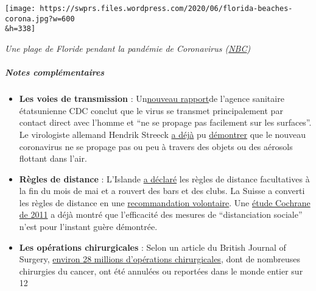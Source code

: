 \texttt{[image: https://swprs.files.wordpress.com/2020/06/florida-beaches-corona.jpg?w=600\\\&h=338]}

\emph{Une plage de Floride pendant la pandémie de Coronavirus
(\href{https://www.nbcnews.com/news/us-news/coronavirus-comes-spring-break-locals-close-florida-beaches-after-governor-n1163741}{NBC})}

\hypertarget{notes-compluxe9mentaires}{%
\subparagraph{\texorpdfstring{\textbf{Notes
complémentaires}}{Notes complémentaires}}\label{notes-compluxe9mentaires}}

\begin{itemize}
\tightlist
\item
  \textbf{Les voies de transmission} :
  Un\href{https://www.yahoo.com/lifestyle/cdc-coronavirus-mainly-spreads-through-persontoperson-contact-and-does-not-spread-easily-on-contaminated-surfaces-153317029.html}{nouveau
  rapport}de l'agence sanitaire étatsunienne CDC conclut que le virus se
  transmet principalement par contact direct avec l'homme et ``ne se
  propage pas facilement sur les surfaces''. Le virologiste allemand
  Hendrik Streeck
  \href{https://www.telegraph.co.uk/news/2020/04/02/no-proof-coronavirus-can-spread-shopping-says-leading-german/}{a
  déjà} pu
  \href{https://www.telegraph.co.uk/news/2020/04/02/no-proof-coronavirus-can-spread-shopping-says-leading-german/}{démontrer}
  que le nouveau coronavirus ne se propage pas ou peu à travers des
  objets ou des aérosols flottant dans l'air.
\item
  \textbf{Règles de distance} : L'Islande
  \href{https://www.telegraph.co.uk/news/2020/04/02/no-proof-coronavirus-can-spread-shopping-says-leading-german/}{a
  déclaré} les règles de distance facultatives à la fin du mois de mai
  et a rouvert des bars et des clubs. La Suisse a converti les règles de
  distance en une
  \href{https://www.20min.ch/story/bund-schafft-die-2-meter-abstands-busse-heimlich-ab-763738047957}{recommandation
  volontaire}. Une
  \href{https://www.cochranelibrary.com/cdsr/doi/10.1002/14651858.CD006207.pub4/full}{étude
  Cochrane de 2011} a déjà montré que l'efficacité des mesures de
  ``distanciation sociale'' n'est pour l'instant guère démontrée.
\item
  \textbf{Les opérations chirurgicales} : Selon un article du British
  Journal of Surgery,
  \href{https://bjssjournals.onlinelibrary.wiley.com/doi/abs/10.1002/bjs.11746}{environ
  28 millions d'opérations chirurgicales}, dont de nombreuses chirurgies
  du cancer, ont été annulées ou reportées dans le monde entier sur 12

\end{itemize}
